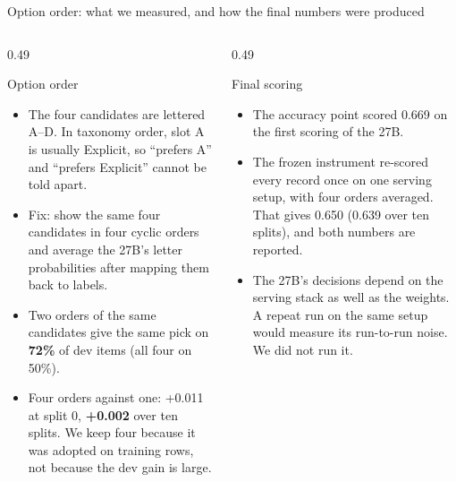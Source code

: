 \begin{frame}{Option order: what we measured, and how the final numbers were produced}
  \footnotesize
  \begin{columns}[T,onlytextwidth]
    \begin{column}{0.49\textwidth}
      \begin{block}{Option order}
        \begin{itemize}\setlength{\itemsep}{2pt}
          \item The four candidates are lettered A--D. In taxonomy order, slot A is usually Explicit, so ``prefers A'' and ``prefers Explicit'' cannot be told apart.
          \item Fix: show the same four candidates in four cyclic orders and average the 27B's letter probabilities after mapping them back to labels.
          \item Two orders of the same candidates give the same pick on \textbf{72\%} of dev items (all four on 50\%).
          \item Four orders against one: +0.011 at split 0, \textbf{+0.002} over ten splits. We keep four because it was adopted on training rows, not because the dev gain is large.
        \end{itemize}
      \end{block}
    \end{column}
    \begin{column}{0.49\textwidth}
      \begin{block}{Final scoring}
        \begin{itemize}\setlength{\itemsep}{2pt}
          \item The accuracy point scored 0.669 on the first scoring of the 27B.
          \item The frozen instrument re-scored every record once on one serving setup, with four orders averaged. That gives 0.650 (0.639 over ten splits), and both numbers are reported.
          \item The 27B's decisions depend on the serving stack as well as the weights. A repeat run on the same setup would measure its run-to-run noise. We did not run it.
        \end{itemize}
      \end{block}
    \end{column}
  \end{columns}
\end{frame}

